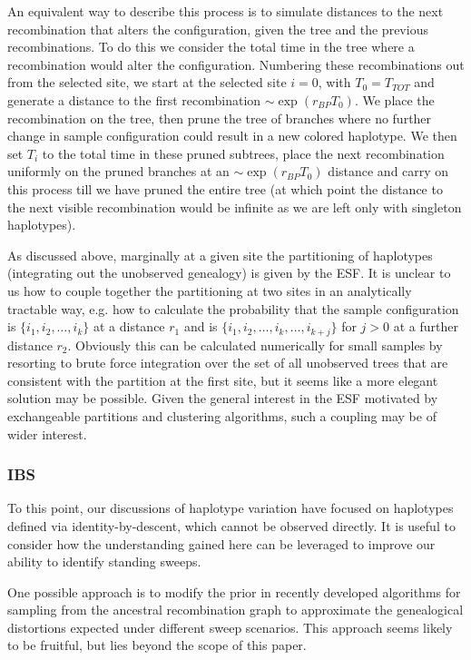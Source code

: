 \documentclass[a4paper,10pt]{article}
\begin{document}
An equivalent way to describe this process is to simulate distances to the next recombination that alters the configuration, given the tree and the previous recombinations. To do this we consider the total time in the tree where a recombination would alter the configuration. Numbering these recombinations out from the selected site,  we start at the selected site $i=0$, with $T_0 = T_{TOT}$ and generate a distance to the first recombination $\sim \exp(r_{BP} T_0)$. We place the recombination on the tree, then prune the tree of branches where no further change in sample configuration could result in a new colored haplotype. We then set $T_i$ to the total time in these pruned subtrees, place the next recombination uniformly on the pruned branches at an $\sim \exp(r_{BP} T_0)$ distance and carry on this process till we have pruned the entire tree (at which point the distance to the next visible recombination would be infinite as we are left only with singleton haplotypes). 

As discussed above, marginally at a given site the partitioning of haplotypes (integrating out the unobserved genealogy) is given by the ESF. It is unclear to us how to couple together the partitioning at two sites in an analytically tractable way, e.g. how to calculate the probability that the sample configuration is $\{i_1,i_2,\dots,i_k\}$ at a distance $r_1$ and is $\{i_1,i_2,\dots,i_k,\dots,i_{k+j}\}$ for $j>0$ at a further distance $r_2$. Obviously this can be calculated numerically for small samples by resorting to brute force integration over the set of all unobserved trees that are consistent with the partition at the first site, but it seems like a more elegant solution may be possible. Given the general interest in the ESF motivated by exchangeable partitions and clustering algorithms, such a coupling may be of wider interest.
 
\subsubsection*{IBS}
To this point, our discussions of haplotype variation have focused on haplotypes defined via identity-by-descent, which cannot be observed directly. It is useful to consider how the understanding gained here can be leveraged to improve our ability to identify standing sweeps. 

One possible approach is to modify the prior in recently developed algorithms for sampling from the ancestral recombination graph \citep[e.g. ARGweaver,][]{Rasmussen:2014gj} to approximate the genealogical distortions expected under different sweep scenarios. This approach seems likely to be fruitful, but lies beyond the scope of this paper.
\end{document}
